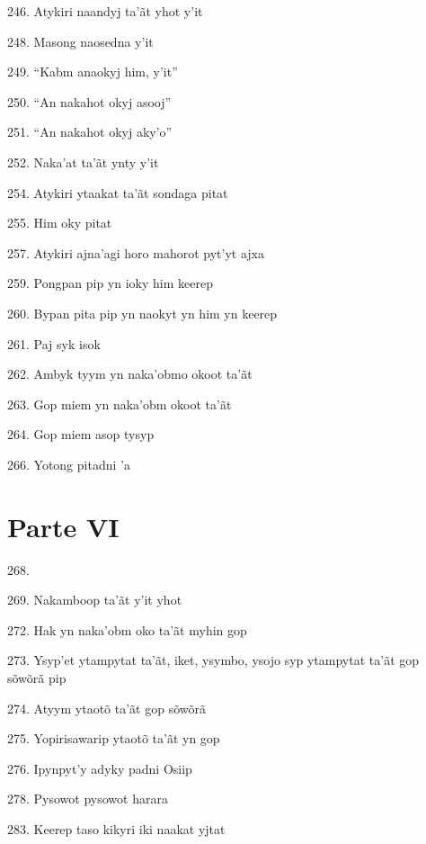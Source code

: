 246. Atykiri naandyj ta'ãt yhot y'it

248. Masong naosedna y'it

249. ``Kabm anaokyj him, y'it''

250. ``An nakahot okyj asooj''

251. ``An nakahot okyj aky'o''

252. Naka'at ta'ãt ynty y'it

254. Atykiri ytaakat ta'ãt sondaga pitat

255. Him oky pitat

257. Atykiri ajna'agi horo mahorot pyt'yt ajxa

259. Pongpan pip yn ioky him keerep

260. Bypan pita pip yn naokyt yn him yn keerep

261. Paj syk isok

262. Ambyk tyym yn naka'obmo okoot ta'ãt

263. Gop miem yn naka'obm okoot ta'ãt

264. Gop miem asop tysyp

266. Yotong pitadni 'a

\section{Parte VI}

268.

269. Nakamboop ta'ãt y'it yhot

272. Hak yn naka'obm oko ta'ãt myhin gop

273. Ysyp'et ytampytat ta'ãt, iket, ysymbo, ysojo syp ytampytat ta'ãt gop sõwõrã pip

274. Atyym ytaotõ ta'ãt gop sõwõrã

275. Yopirisawarip ytaotõ ta'ãt yn gop

276. Ipynpyt'y adyky padni Osiip

278. Pysowot pysowot harara

283. Keerep taso kikyri iki naakat yjtat